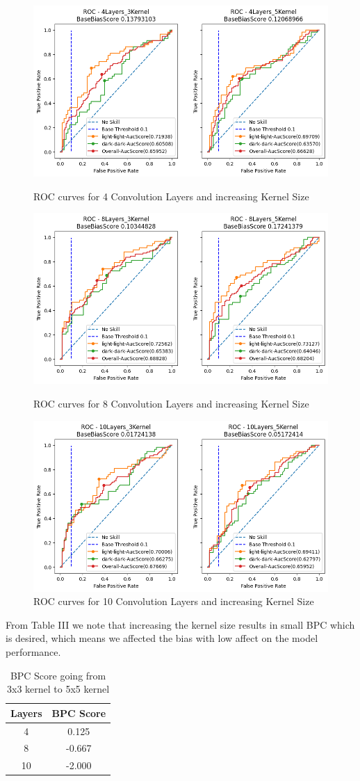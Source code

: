 \documentclass[conference]{IEEEtran}
\begin{document}
\begin{figure}[hbt!]
   \centering
    \includegraphics[width=0.7\linewidth]{latex/images/4Layers_3Kernel_4Layers_5Kernel.png}
    \caption{ROC curves for 4 Convolution Layers and increasing Kernel Size }
    \label{4Layers_3Kernel_4Layers_5Kernel}
    \centering
    \includegraphics[width=0.7\linewidth]{latex/images/8Layers_3Kernel_8Layers_5Kernel.png}
    \caption{ROC curves for 8 Convolution Layers and increasing Kernel Size }
    \label{8Layers_3Kernel_8Layers_5Kernel}
    \centering
    \includegraphics[width=0.7\linewidth]{latex/images/10Layers_3Kernel_10Layers_5Kernel.png}
    \caption{ROC curves for 10 Convolution Layers and increasing Kernel Size }
    \label{10Layers_3Kernel_10Layers_5Kernel}
\end{figure}

From Table III we note that increasing the kernel size results in small BPC which is desired, which means we affected the bias with low affect on the model performance.
\begin{table}[!hb]
\renewcommand{\arraystretch}{1.3}
\caption{BPC Score going from 3x3 kernel to 5x5 kernel}
\label{tab:bpc_scores}
\centering
\begin{tabular}{cc}
\toprule
\textbf{Layers} & \textbf{BPC Score} \\
\midrule
4 & 0.125 \\
8 & -0.667 \\
10 & -2.000 \\
\bottomrule
\end{tabular}
\end{table}
\end{document}
